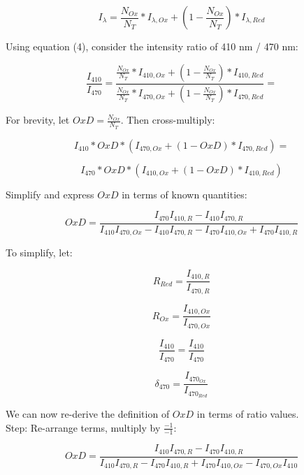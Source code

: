 \documentclass{article}
\begin{document}
\begin{equation}
I_{\lambda} = \frac{N_{Ox}}{N_T} * I_{\lambda, Ox} +  (1-\frac{N_{Ox}}{N_T}) * I_{\lambda, Red}
\end{equation}

Using equation (4), consider the intensity ratio of 410 nm / 470 nm:

$$
    \frac{I_{410}}{I_{470}} = \frac{\frac{N_{Ox}}{N_T} * I_{410, Ox} +  (1-\frac{N_{Ox}}{N_T}) * I_{410, Red}}
                             {\frac{N_{Ox}}{N_T} * I_{470, Ox} +  (1-\frac{N_{Ox}}{N_T}) * I_{470, Red}} = 
$$

For brevity, let $OxD = \frac{N_{Ox}}{N_{T}}$. Then cross-multiply:

$$
    I_{410}*OxD*(I_{470, Ox} +  (1-OxD) * I_{470, Red}) = 
$$

$$
    I_{470}*OxD * (I_{410, Ox} +  (1-OxD) * I_{410, Red})
$$

Simplify and express $OxD$ in terms of known quantities:

\begin{equation}
OxD = \frac{I_{470}I_{410, R}-I_{410}I_{470, R}}{I_{410}I_{470,Ox} - I_{410}I_{470, R} - I_{470}I_{410, Ox} + I_{470}I_{410, R}}
\end{equation}

To simplify, let:

\begin{equation}
    R_{Red} = \frac{I_{410, R}}{I_{470, R}}
\end{equation}

\begin{equation}
    R_{Ox} = \frac{I_{410, Ox}}{I_{470, Ox}}
\end{equation}

\begin{equation}
    \frac{I_{410}}{I_{470}} = \frac{I_{410}}{I_{470}}
\end{equation}

\begin{equation}
    \delta_{470} = \frac{I_{470_{Ox}}}{I_{470_{Red}}}
\end{equation}

We can now re-derive the definition of $OxD$ in terms of ratio values. \\

Step: Re-arrange terms, multiply by $\frac{-1}{-1}$:

$$ OxD =  \frac{I_{410}I_{470,R} - I_{470}I_{410,R}}{I_{410}I_{470,R} - I_{470}I_{410,R} + I_{470}I_{410,Ox} - I_{470, Ox}I_{410}} $$ \\
\end{document}

